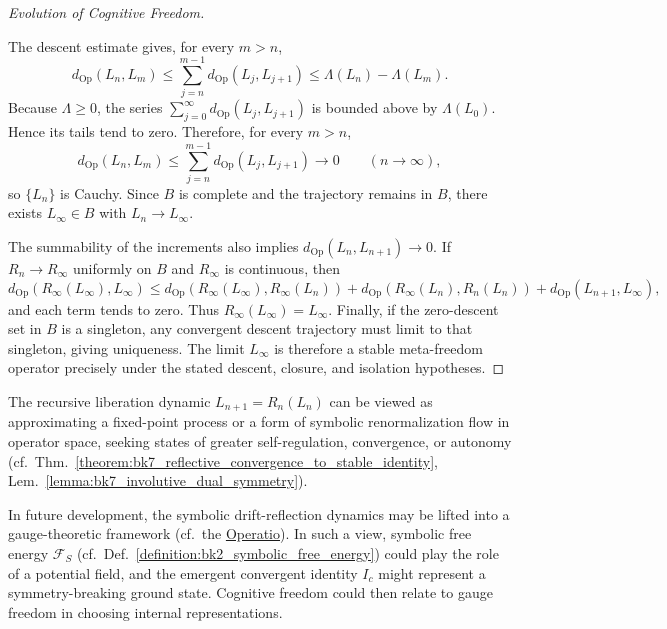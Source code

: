 \begin{proof}[Evolution of Cognitive Freedom]
\label{proof:bk9_evolution_of_cognitive_freedom}
\leavevmode

The descent estimate gives, for every $m>n$,
\[
d_{\mathrm{Op}}(L_n,L_m)
\leq \sum_{j=n}^{m-1}d_{\mathrm{Op}}(L_j,L_{j+1})
\leq \Lambda(L_n)-\Lambda(L_m).
\]
Because $\Lambda\geq0$, the series
$\sum_{j=0}^{\infty}d_{\mathrm{Op}}(L_j,L_{j+1})$ is bounded above by
$\Lambda(L_0)$. Hence its tails tend to zero. Therefore, for every $m>n$,
\[
d_{\mathrm{Op}}(L_n,L_m)
\leq \sum_{j=n}^{m-1}d_{\mathrm{Op}}(L_j,L_{j+1})\to0
\qquad (n\to\infty),
\]
so $\{L_n\}$ is Cauchy. Since $B$ is complete and the trajectory remains in
$B$, there exists $L_\infty\in B$ with $L_n\to L_\infty$.

The summability of the increments also implies
$d_{\mathrm{Op}}(L_n,L_{n+1})\to0$. If $R_n\to R_\infty$ uniformly on $B$ and
$R_\infty$ is continuous, then
\[
d_{\mathrm{Op}}(R_\infty(L_\infty),L_\infty)
\leq d_{\mathrm{Op}}(R_\infty(L_\infty),R_\infty(L_n))
 +d_{\mathrm{Op}}(R_\infty(L_n),R_n(L_n))
 +d_{\mathrm{Op}}(L_{n+1},L_\infty),
\]
and each term tends to zero. Thus $R_\infty(L_\infty)=L_\infty$.
Finally, if the zero-descent set in $B$ is a singleton, any convergent descent
trajectory must limit to that singleton, giving uniqueness. The limit
$L_\infty$ is therefore a stable meta-freedom operator precisely under the
stated descent, closure, and isolation hypotheses.

\end{proof}
\begin{remark}
\label{remark:bk9_recursive_seeking}
The recursive liberation dynamic $L_{n+1} = R_n(L_n)$ can be viewed as approximating a fixed-point process or a form of symbolic renormalization flow in operator space, seeking states of greater self-regulation, convergence, or autonomy (cf.~Thm.~\ref{theorem:bk7_reflective_convergence_to_stable_identity}, Lem.~\ref{lemma:bk7_involutive_dual_symmetry}).
\end{remark}
\begin{remark}
\label{remark:bk9_gauge_theoretic_perspective}
In future development, the symbolic drift-reflection dynamics may be lifted into a gauge-theoretic framework (cf.~the \hyperref[sec:bk1_operatio]{Operatio}). In such a view, symbolic free energy $\mathcal{F}_S$ (cf.~Def.~\ref{definition:bk2_symbolic_free_energy}) could play the role of a potential field, and the emergent convergent identity $I_c$ might represent a symmetry-breaking ground state. Cognitive freedom could then relate to gauge freedom in choosing internal representations.
\end{remark}
